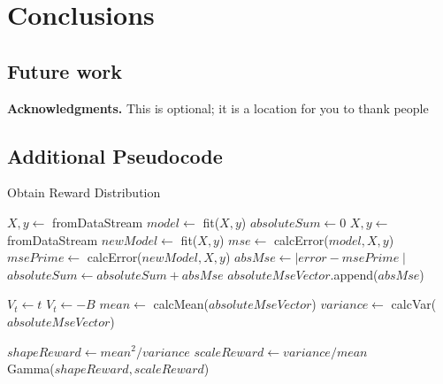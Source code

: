 \documentclass{mpaper}
\begin{document}
\section{Conclusions}

\subsection*{Future work}

{\bf Acknowledgments.}
This is optional; it is a location for you to thank people




\begin{appendix}

\section{Additional Pseudocode}\label{rewarddist}
\begin{algorithm}[h]
\caption{Obtain Reward Distribution}
\begin{algorithmic}
    \State $X, y \gets$ fromDataStream
    \State $model \gets$ fit($X,y$)
    \State $absoluteSum \gets 0$
        \State $X, y \gets$ fromDataStream
        \State $newModel \gets$ fit($X,y$)
        \State $mse \gets$ calcError($model,X,y$)
        \State $msePrime \gets$ calcError($newModel,X,y$)
        \State $absMse \gets \mid error - msePrime \mid$
        \State $absoluteSum \gets absoluteSum + absMse$
        \State $absoluteMseVector$.append($absMse$)
        
            \State $V_t \gets t$
        \Else
            \State $V_t \gets -B$
        \EndIf
    \EndFor
    \State $mean \gets$ calcMean($absoluteMseVector$)
    \State $variance \gets$ calcVar($absoluteMseVector$)
    
    \State $shapeReward \gets mean^2/variance$
    \State $scaleReward \gets variance/mean$\\
    \Return Gamma($shapeReward, scaleReward$)
    
\EndFunction
\end{algorithmic}
\end{algorithm}


\end{appendix}
\end{document}
